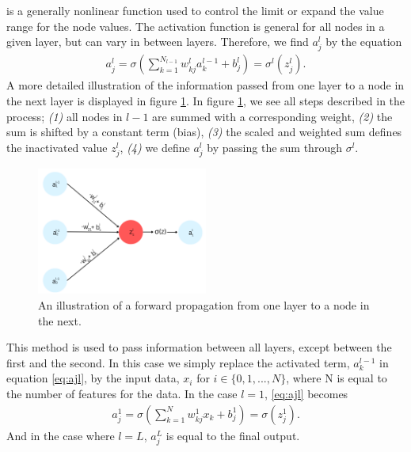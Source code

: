 is a generally nonlinear function used to control the limit or expand the value range for the node values. The activation 
function is general for all nodes in a given layer, but can vary in between layers. Therefore,
we find $a_j^l$ by the equation
\begin{align}\label{eq:ajl}
    a_j^l = \sigma \left (\sum_{k=1} ^ {N_{l-1}} w_{kj}^la_k^{l-1} + b^l_j\right ) = \sigma^l(z_j^l).
\end{align}
A more detailed illustration of the information passed from one layer to a node in the next layer is displayed 
in figure \ref{fig:WB}. In figure \ref{fig:WB}, we see all steps described in the process; \emph{(1)} all nodes in 
$l-1$ are summed with a corresponding weight, \emph{(2)} the sum is shifted by a constant term (bias), \emph{(3)} the 
scaled and weighted sum defines the inactivated value $z_j^l$, \emph{(4)} we define $a^l_j$ by passing the 
sum through $\sigma^l$.  
\begin{figure}
    \centering
    \includegraphics[width=0.5\textwidth]{Figures/Illustrations/WeightBias.png}
    \caption{An illustration of a forward propagation from one layer to a node in the next.}
    \label{fig:WB}
\end{figure}
This method is used to pass information between all layers, except between the first and the second. 
In this case we simply replace the activated term, $a_k^{l-1}$ in equation \ref{eq:ajl}, by the input data,
$x_i$ for $i\in\{0,1,...,N\}$, where N is equal to the number of features for the data. In the case $l=1$, \ref{eq:ajl} 
becomes
\begin{align}
    a_j^1 = \sigma \left (\sum_{k=1} ^ {N} w_{kj}^1x_k + b^1_j\right ) = \sigma(z_j^1).
\end{align}
And in the case where $l=L$, $a_j^L$ is equal to the final output. 
